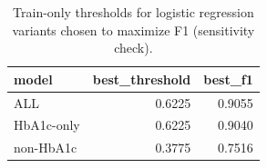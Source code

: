 \begin{table}[H]
\begin{center}
\begin{tabular}{lrr}
\toprule
model & best_threshold & best_f1 \\
\midrule
ALL & 0.6225 & 0.9055 \\
HbA1c-only & 0.6225 & 0.9040 \\
non-HbA1c & 0.3775 & 0.7516 \\
\bottomrule
\end{tabular}
\end{center}
\vspace{-5pt}
\caption{Train-only thresholds for logistic regression variants chosen to maximize F1 (sensitivity check).}
\label{tab:logit_thresholds_f1_train}
\end{table}
